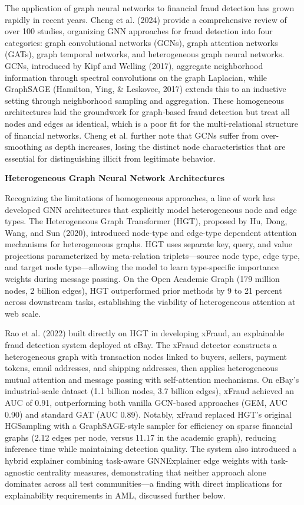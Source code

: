 \documentclass[12pt,a4paper]{article}
\begin{document}
\noindent The application of graph neural networks to financial fraud detection has grown rapidly in recent years. Cheng et al. (2024) provide a comprehensive review of over 100 studies, organizing GNN approaches for fraud detection into four categories: graph convolutional networks (GCNs), graph attention networks (GATs), graph temporal networks, and heterogeneous graph neural networks. GCNs, introduced by Kipf and Welling (2017), aggregate neighborhood information through spectral convolutions on the graph Laplacian, while GraphSAGE (Hamilton, Ying, \& Leskovec, 2017) extends this to an inductive setting through neighborhood sampling and aggregation. These homogeneous architectures laid the groundwork for graph-based fraud detection but treat all nodes and edges as identical, which is a poor fit for the multi-relational structure of financial networks. Cheng et al. further note that GCNs suffer from over-smoothing as depth increases, losing the distinct node characteristics that are essential for distinguishing illicit from legitimate behavior.

\bigskip
\noindent\textbf{Heterogeneous Graph Neural Network Architectures}

\noindent Recognizing the limitations of homogeneous approaches, a line of work has developed GNN architectures that explicitly model heterogeneous node and edge types. The Heterogeneous Graph Transformer (HGT), proposed by Hu, Dong, Wang, and Sun (2020), introduced node-type and edge-type dependent attention mechanisms for heterogeneous graphs. HGT uses separate key, query, and value projections parameterized by meta-relation triplets---source node type, edge type, and target node type---allowing the model to learn type-specific importance weights during message passing. On the Open Academic Graph (179 million nodes, 2 billion edges), HGT outperformed prior methods by 9 to 21 percent across downstream tasks, establishing the viability of heterogeneous attention at web scale.

Rao et al. (2022) built directly on HGT in developing xFraud, an explainable fraud detection system deployed at eBay. The xFraud detector constructs a heterogeneous graph with transaction nodes linked to buyers, sellers, payment tokens, email addresses, and shipping addresses, then applies heterogeneous mutual attention and message passing with self-attention mechanisms. On eBay's industrial-scale dataset (1.1 billion nodes, 3.7 billion edges), xFraud achieved an AUC of 0.91, outperforming both vanilla GCN-based approaches (GEM, AUC 0.90) and standard GAT (AUC 0.89). Notably, xFraud replaced HGT's original HGSampling with a GraphSAGE-style sampler for efficiency on sparse financial graphs (2.12 edges per node, versus 11.17 in the academic graph), reducing inference time while maintaining detection quality. The system also introduced a hybrid explainer combining task-aware GNNExplainer edge weights with task-agnostic centrality measures, demonstrating that neither approach alone dominates across all test communities---a finding with direct implications for explainability requirements in AML, discussed further below.
\end{document}
